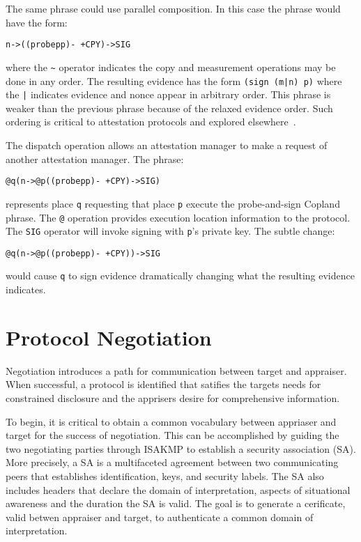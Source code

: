 \documentclass[sigconf,authordraft]{acmart}
\begin{document}
The same phrase could use parallel composition.  In this case the
phrase would have the form:

\begin{alltt}
  n -> ((probe p p) -~+ CPY) -> SIG
\end{alltt}

\noindent where the \verb+~+ operator indicates the copy and
measurement operations may be done in any order.  The resulting
evidence has the form \verb+(sign (m|n) p)+ where the \verb+|+
indicates evidence and nonce appear in arbitrary order.  This phrase
is weaker than the previous phrase because of the relaxed evidence
order.  Such ordering is critical to attestation protocols and
explored elsewhere~\cite{Rowe:2016bi}.

The dispatch operation allows an attestation manager to make a request
of another attestation manager.  The phrase:

\begin{alltt}
  @q(n -> @p((probe p p) -~+ CPY) -> SIG)
\end{alltt}

\noindent represents place \verb+q+ requesting that place \verb+p+
execute the probe-and-sign Copland phrase.  The \verb+@+ operation
provides execution location information to the protocol.  The
\verb+SIG+ operator will invoke signing with \verb+p+'s private
key. The subtle change:

\begin{alltt}
  @q(n -> @p((probe p p) -~+ CPY)) -> SIG
\end{alltt}

\noindent would cause \verb+q+ to sign evidence dramatically changing
what the resulting evidence indicates.

\section{Protocol Negotiation}

Negotiation introduces a path for communication between target and
appraiser. When successful, a protocol is identified that satifies the
targets needs for constrained disclosure and the apprisers desire for
comprehensive information.

To begin, it is critical to obtain a common vocabulary between appriaser and target for the success of negotiation. This can be accomplished by guiding the two negotiating parties through ISAKMP to establish a security association (SA).  More precisely,
a SA is a multifaceted agreement between two communicating peers that
establishes identification, keys, and security labels. The SA also
includes headers that declare the domain of interpretation, aspects of 
situational awareness and the duration the SA is valid. The goal is to generate a  cerificate, valid betwen appraiser and target, to
authenticate a common domain of interpretation.
\end{document}
